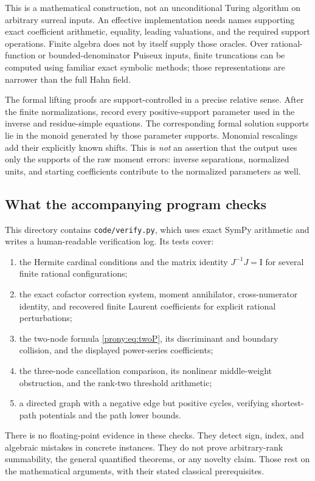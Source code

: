 \documentclass[11pt,letterpaper]{article}
\theoremstyle{definition}
\theoremstyle{remark}
\newcommand{\Id}{\mathrm I}
\newcommand{\lbl}[1]{\nolinkurl{#1}}%
\begin{document}
This is a mathematical construction, not an unconditional Turing algorithm
on arbitrary surreal inputs. An effective implementation needs names
supporting exact coefficient arithmetic, equality, leading valuations, and
the required support operations. Finite algebra does not by itself supply
those oracles. Over rational-function or bounded-denominator Puiseux inputs,
finite truncations can be computed using familiar exact symbolic methods;
those representations are narrower than the full Hahn field.

The formal lifting proofs are support-controlled in a precise relative
sense. After the finite normalizations, record every positive-support
parameter used in the inverse and residue-simple equations. The corresponding
formal solution supports lie in the monoid generated by those parameter
supports. Monomial rescalings add their explicitly known shifts. This is
\emph{not} an assertion that the output uses only the supports of the raw
moment errors: inverse separations, normalized units, and starting
coefficients contribute to the normalized parameters as well.

\subsection{What the accompanying program checks}
This directory contains \lbl{code/verify.py}, which uses exact SymPy
arithmetic and writes a human-readable verification log. Its tests cover:
\begin{enumerate}
\item the Hermite cardinal conditions and the matrix identity
      $J^{-1}J=\Id$ for several finite rational configurations;
\item the exact cofactor correction system, moment annihilator,
      cross-numerator identity, and recovered finite Laurent coefficients
      for explicit rational perturbations;
\item the two-node formula \eqref{prony:eq:twoP}, its discriminant and boundary
      collision, and the displayed power-series coefficients;
\item the three-node cancellation comparison, its nonlinear middle-weight
      obstruction, and the rank-two threshold arithmetic;
\item a directed graph with a negative edge but positive cycles, verifying
      shortest-path potentials and the path lower bounds.
\end{enumerate}
There is no floating-point evidence in these checks. They detect sign,
index, and algebraic mistakes in concrete instances. They do not prove
arbitrary-rank summability, the general quantified theorems, or any novelty
claim. Those rest on the mathematical arguments, with their stated
classical prerequisites.
\end{document}
